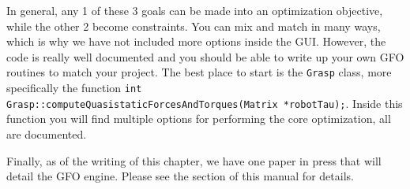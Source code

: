 In general, any 1 of these 3 goals can be made into an optimization
objective, while the other 2 become constraints. You can mix and match
in many ways, which is why we have not included more options inside
the GUI. However, the code is really well documented and you should be
able to write up your own GFO routines to match your project. The best
place to start is the \texttt{Grasp} class, more specifically the
function \texttt{int Grasp::computeQuasistaticForcesAndTorques(Matrix
  *robotTau);}. Inside this function you will find multiple options
for performing the core optimization, all are documented.

Finally, as of the writing of this chapter, we have one paper in press
that will detail the GFO engine. Please see the
 section of this manual for
details.

